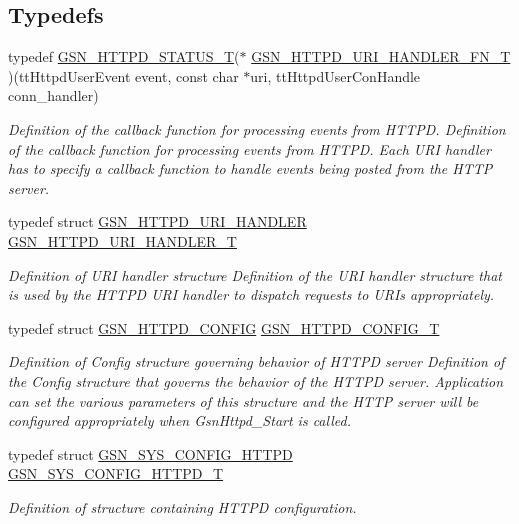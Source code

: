 \subsection*{Typedefs}
\begin{DoxyCompactItemize}
\item 
typedef \hyperlink{a00666_ga97ddf6ff1568f9984c83a2161cd9f49d}{GSN\_\-HTTPD\_\-STATUS\_\-T}($\ast$ \hyperlink{a00666_ga37351c58635a4a2a10675d5ea28e37be}{GSN\_\-HTTPD\_\-URI\_\-HANDLER\_\-FN\_\-T} )(ttHttpdUserEvent event, const char $\ast$uri, ttHttpdUserConHandle conn\_\-handler)
\begin{DoxyCompactList}\small\item\em Definition of the callback function for processing events from HTTPD. Definition of the callback function for processing events from HTTPD. Each URI handler has to specify a callback function to handle events being posted from the HTTP server. \end{DoxyCompactList}\item 
typedef struct \hyperlink{a00097}{GSN\_\-HTTPD\_\-URI\_\-HANDLER} \hyperlink{a00666_ga3dd2e2bbc2820f5f49868effb95b371a}{GSN\_\-HTTPD\_\-URI\_\-HANDLER\_\-T}
\begin{DoxyCompactList}\small\item\em Definition of URI handler structure Definition of the URI handler structure that is used by the HTTPD URI handler to dispatch requests to URIs appropriately. \end{DoxyCompactList}\item 
typedef struct \hyperlink{a00095}{GSN\_\-HTTPD\_\-CONFIG} \hyperlink{a00666_ga5049df4d9f9df24293e341c70976f6c3}{GSN\_\-HTTPD\_\-CONFIG\_\-T}
\begin{DoxyCompactList}\small\item\em Definition of Config structure governing behavior of HTTPD server Definition of the Config structure that governs the behavior of the HTTPD server. Application can set the various parameters of this structure and the HTTP server will be configured appropriately when GsnHttpd\_\-Start is called. \end{DoxyCompactList}\item 
typedef struct \hyperlink{a00246}{GSN\_\-SYS\_\-CONFIG\_\-HTTPD} \hyperlink{a00508_a99fe9448f197945df42731f9f0a5e7e3}{GSN\_\-SYS\_\-CONFIG\_\-HTTPD\_\-T}
\begin{DoxyCompactList}\small\item\em Definition of structure containing HTTPD configuration. \end{DoxyCompactList}\end{DoxyCompactItemize}
